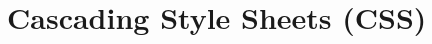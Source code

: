 %
%
% 
% 
% 


\chapter{Cascading Style Sheets (CSS)}

\label{chap:CSS}

\citet{w3school}
\citep{w3school}


\citet{vtldesign}
\citep{vtldesign}

\citet{head2016designing}
\citep{head2016designing}